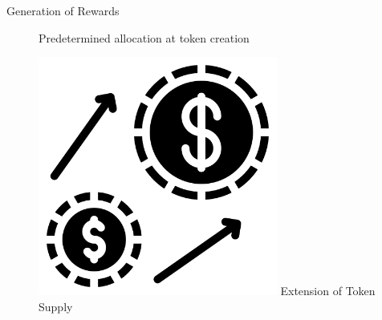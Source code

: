 \documentclass[handout]{beamer}
\begin{document}
\begin{frame}{Generation of Rewards}
\begin{figure}[H]
\begin{minipage}[t]{.25\textwidth}
    Predetermined allocation at token creation
  \end{minipage}
  \hfill
  \begin{minipage}[t]{.25\textwidth}
  \center 
    \includegraphics[width=0.7\textwidth]{../assets/images/inflation.png}
    \vspace{0.8em}\vspace{0.8em}
    Extension of Token Supply
  \end{minipage}  
\end{figure}




	
\end{frame}


\end{document}
